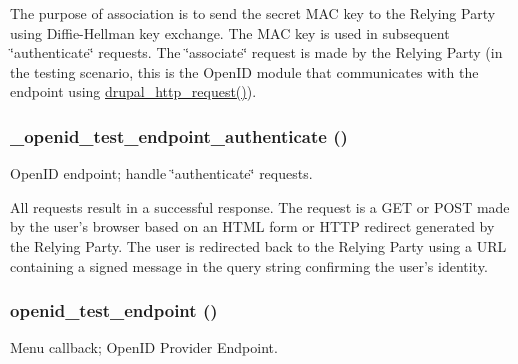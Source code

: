The purpose of association is to send the secret MAC key to the Relying Party using Diffie-\/Hellman key exchange. The MAC key is used in subsequent \char`\"{}authenticate\char`\"{} requests. The \char`\"{}associate\char`\"{} request is made by the Relying Party (in the testing scenario, this is the OpenID module that communicates with the endpoint using \hyperlink{group__http__handling_gaad3affacd718b960300dcdddefa518aa}{drupal\_\-http\_\-request()}). \hypertarget{openid__test_8module_a2b1e3e0e1513bdb25d5bfb82dfc8f391}{
\subsubsection[{\_\-openid\_\-test\_\-endpoint\_\-authenticate}]{\setlength{\rightskip}{0pt plus 5cm}\_\-openid\_\-test\_\-endpoint\_\-authenticate ()}}
\label{openid__test_8module_a2b1e3e0e1513bdb25d5bfb82dfc8f391}
OpenID endpoint; handle \char`\"{}authenticate\char`\"{} requests.

All requests result in a successful response. The request is a GET or POST made by the user's browser based on an HTML form or HTTP redirect generated by the Relying Party. The user is redirected back to the Relying Party using a URL containing a signed message in the query string confirming the user's identity. \hypertarget{openid__test_8module_a2d237a2f5e4762d3493ea851217e4e90}{
\subsubsection[{openid\_\-test\_\-endpoint}]{\setlength{\rightskip}{0pt plus 5cm}openid\_\-test\_\-endpoint ()}}
\label{openid__test_8module_a2d237a2f5e4762d3493ea851217e4e90}
Menu callback; OpenID Provider Endpoint.

